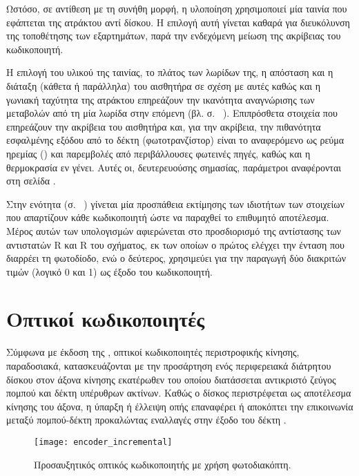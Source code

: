 Ωστόσο, σε αντίθεση με τη συνήθη μορφή, η υλοποίηση χρησιμοποιεί μία ταινία που
εφάπτεται της ατράκτου αντί δίσκου. Η επιλογή αυτή γίνεται καθαρά για
διευκόλυνση της τοποθέτησης των εξαρτημάτων, παρά την ενδεχόμενη μείωση της
ακρίβειας του κωδικοποιητή.

Η επιλογή του υλικού της ταινίας, το πλάτος των λωρίδων της, η απόσταση και η
διάταξη (κάθετα ή παράλληλα) του αισθητήρα σε σχέση με αυτές καθώς και η γωνιακή
ταχύτητα της ατράκτου επηρεάζουν την ικανότητα αναγνώρισης των μεταβολών από τη
μία λωρίδα στην επόμενη (βλ.  σ.~%
\pageref{subsec:reflex:coupling-factor}).
Επιπρόσθετα στοιχεία που επηρεάζουν την ακρίβεια του αισθητήρα και, για την
ακρίβεια, την πιθανότητα εσφαλμένης εξόδου από το δέκτη (φωτοτρανζίστορ) είναι
το αναφερόμενο ως ρεύμα ηρεμίας () και παρεμβολές από
περιβάλλουσες φωτεινές πηγές, καθώς και η θερμοκρασία εν γένει. Αυτές οι,
δευτερευούσης σημασίας, παράμετροι αναφέρονται στη σελίδα
\pageref{subsec:reflex:other-parameters}.

Στην ενότητα  (σ.~%
\pageref{subsec:reflex:calculations}) γίνεται μία προσπάθεια εκτίμησης των
ιδιοτήτων των στοιχείων που απαρτίζουν κάθε κωδικοποιητή ώστε να παραχθεί το
επιθυμητό αποτέλεσμα.
Μέρος αυτών των υπολογισμών αφιερώνεται στο προσδιορισμό της αντίστασης των
αντιστατών R και R του σχήματος, εκ των οποίων ο πρώτος ελέγχει
την ένταση που διαρρέει τη φωτοδίοδο, ενώ ο δεύτερος, χρησιμεύει για την
παραγωγή δύο διακριτών τιμών (λογικό 0 και 1) ως έξοδο του κωδικοποιητή.


\section{Οπτικοί κωδικοποιητές}
\label{sec:encoder:optical}

Σύμφωνα με έκδοση της \textcite[12]{drc76}, οπτικοί κωδικοποιητές περιστροφικής
κίνησης, παραδοσιακά, κατασκευάζονται με την προσάρτηση ενός περιφερειακά
διάτρητου δίσκου στον άξονα κίνησης εκατέρωθεν του οποίου διατάσσεται αντικριστό
ζεύγος πομπού και δέκτη υπέρυθρων ακτίνων. Καθώς ο δίσκος περιστρέφεται ως
αποτέλεσμα κίνησης του άξονα, η ύπαρξη ή έλλειψη οπής επαναφέρει ή αποκόπτει την
επικοινωνία μεταξύ πομπού-δέκτη προκαλώντας εναλλαγές στην έξοδο του δέκτη
\parencite[12]{drc76}.

\begin{figure}
    \caption{Προσαυξητικός οπτικός κωδικοποιητής με χρήση φωτοδιακόπτη.
    \label{fig:encoder:incremental}}
    \begin{center}
    \texttt{[image: encoder\_incremental]}
    \end{center}
\end{figure}


